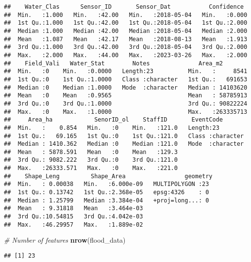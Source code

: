 \documentclass[
]{article}
\newenvironment{Shaded}{\begin{snugshade}}{\end{snugshade}}
\newcommand{\CommentTok}[1]{\textcolor[rgb]{0.56,0.35,0.01}{\textit{#1}}}
\newcommand{\FunctionTok}[1]{\textcolor[rgb]{0.13,0.29,0.53}{\textbf{#1}}}
\newcommand{\NormalTok}[1]{#1}
\begin{document}
\begin{verbatim}
##    Water_Clas      Sensor_ID       Sensor_Dat           Confidence   
##  Min.   :1.000   Min.   :42.00   Min.   :2018-05-04   Min.   :0.000  
##  1st Qu.:1.000   1st Qu.:42.00   1st Qu.:2018-05-04   1st Qu.:2.000  
##  Median :1.000   Median :42.00   Median :2018-05-04   Median :2.000  
##  Mean   :1.087   Mean   :42.17   Mean   :2018-08-13   Mean   :1.913  
##  3rd Qu.:1.000   3rd Qu.:42.00   3rd Qu.:2018-05-04   3rd Qu.:2.000  
##  Max.   :2.000   Max.   :44.00   Max.   :2023-03-26   Max.   :2.000  
##    Field_Vali   Water_Stat        Notes              Area_m2         
##  Min.   :0    Min.   :0.0000   Length:23          Min.   :     8541  
##  1st Qu.:0    1st Qu.:1.0000   Class :character   1st Qu.:   691653  
##  Median :0    Median :1.0000   Mode  :character   Median : 14103620  
##  Mean   :0    Mean   :0.9565                      Mean   : 58785913  
##  3rd Qu.:0    3rd Qu.:1.0000                      3rd Qu.: 90822224  
##  Max.   :0    Max.   :1.0000                      Max.   :263335713  
##     Area_ha            SenorID_ol    StaffID       EventCode        
##  Min.   :    0.854   Min.   :0    Min.   :121.0   Length:23         
##  1st Qu.:   69.165   1st Qu.:0    1st Qu.:121.0   Class :character  
##  Median : 1410.362   Median :0    Median :121.0   Mode  :character  
##  Mean   : 5878.591   Mean   :0    Mean   :129.3                     
##  3rd Qu.: 9082.222   3rd Qu.:0    3rd Qu.:121.0                     
##  Max.   :26333.571   Max.   :0    Max.   :221.0                     
##    Shape_Leng         Shape_Area                 geometry 
##  Min.   : 0.00038   Min.   :6.000e-09   MULTIPOLYGON :23  
##  1st Qu.: 0.13742   1st Qu.:2.368e-05   epsg:4326    : 0  
##  Median : 1.25799   Median :3.384e-04   +proj=long...: 0  
##  Mean   : 9.31818   Mean   :3.464e-03                     
##  3rd Qu.:10.54815   3rd Qu.:4.042e-03                     
##  Max.   :46.29957   Max.   :1.889e-02
\end{verbatim}

\begin{Shaded}
\begin{Highlighting}[]
\CommentTok{\# Number of features}
\FunctionTok{nrow}\NormalTok{(flood\_data)}
\end{Highlighting}
\end{Shaded}

\begin{verbatim}
## [1] 23
\end{verbatim}
\end{document}
